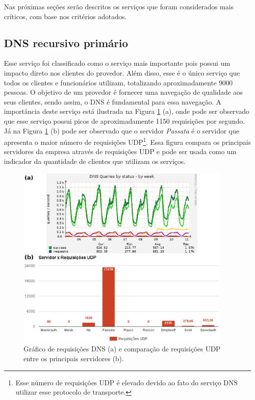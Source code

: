 Nas próximas seções serão descritos os serviços que foram considerados mais críticos, com base nos critérios adotados.

\subsection{DNS recursivo primário}
\label{section:dnsrecprim}

Esse serviço foi classificado como o serviço mais importante pois possui um impacto direto nos clientes do provedor. Além disso, esse é o único 
serviço que todos os clientes e funcionários utilizam, totalizando aproximadamente 9000 pessoas. O objetivo de um provedor é fornecer uma navegação 
de qualidade aos seus clientes, sendo assim, o \ac{DNS} é fundamental para essa navegação. A importância deste serviço está ilustrada na Figura 
\ref{fig:dns_udp} (a), onde pode ser observado que esse serviço possui picos de aproximadamente 1150 requisições por segundo. Já na Figura 
\ref{fig:dns_udp} (b) pode ser observado que o servidor \textit{Passata} é o servidor que apresenta o maior número de requisições 
\ac{UDP}\footnote[1]{Esse número de requisições \ac{UDP} é elevado devido ao fato do serviço \ac{DNS} utilizar esse protocolo de transporte.}. 
Essa figura compara os principais servidores da empresa através de requisições \ac{UDP} e pode ser usada como um indicador da quantidade de 
clientes que utilizam os serviços.

\begin{figure}[h!]
 \centering
 \includegraphics[width=400px]{img/dns_udp.eps}
 \caption{Gráfico de requisições DNS (a) e comparação de requisições UDP entre os principais servidores (b).}
 \label{fig:dns_udp}
\end{figure}

